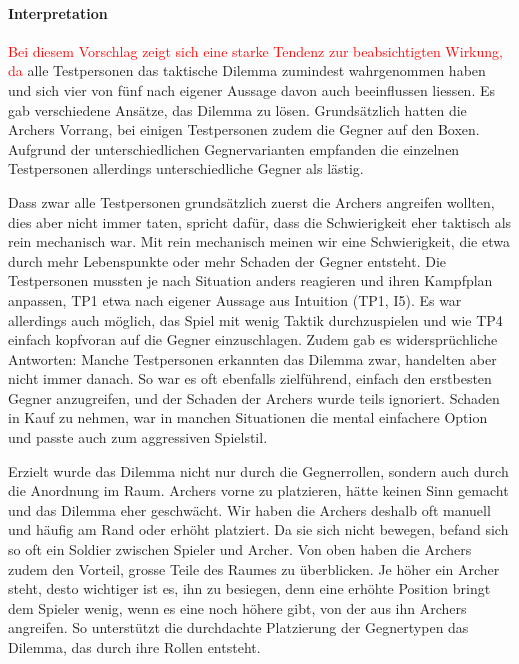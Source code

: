 \documentclass[../Main.tex]{subfiles}
\begin{document}
\paragraph{Interpretation}
\textcolor{red}{Bei diesem Vorschlag zeigt sich eine starke Tendenz zur beabsichtigten Wirkung, da} alle Testpersonen das taktische Dilemma zumindest wahrgenommen haben und sich vier von fünf nach eigener Aussage davon auch beeinflussen liessen. Es gab verschiedene Ansätze, das Dilemma zu lösen. Grundsätzlich hatten die Archers Vorrang, bei einigen Testpersonen zudem die Gegner auf den Boxen. Aufgrund der unterschiedlichen Gegnervarianten empfanden die einzelnen Testpersonen allerdings unterschiedliche Gegner als lästig.

Dass zwar alle Testpersonen grundsätzlich zuerst die Archers angreifen wollten, dies aber nicht immer taten, spricht dafür, dass die Schwierigkeit eher taktisch als rein mechanisch war. Mit rein mechanisch meinen wir eine Schwierigkeit, die etwa durch mehr Lebenspunkte oder mehr Schaden der Gegner entsteht. Die Testpersonen mussten je nach Situation anders reagieren und ihren Kampfplan anpassen, TP1 etwa nach eigener Aussage aus Intuition (TP1, I5). Es war allerdings auch möglich, das Spiel mit wenig Taktik durchzuspielen und wie TP4 einfach kopfvoran auf die Gegner einzuschlagen. Zudem gab es widersprüchliche Antworten: Manche Testpersonen erkannten das Dilemma zwar, handelten aber nicht immer danach. So war es oft ebenfalls zielführend, einfach den erstbesten Gegner anzugreifen, und der Schaden der Archers wurde teils ignoriert. Schaden in Kauf zu nehmen, war in manchen Situationen die mental einfachere Option und passte auch zum aggressiven Spielstil.

Erzielt wurde das Dilemma nicht nur durch die Gegnerrollen, sondern auch durch die Anordnung im Raum. Archers vorne zu platzieren, hätte keinen Sinn gemacht und das Dilemma eher geschwächt. Wir haben die Archers deshalb oft manuell und häufig am Rand oder erhöht platziert. Da sie sich nicht bewegen, befand sich so oft ein Soldier zwischen Spieler und Archer. Von oben haben die Archers zudem den Vorteil, grosse Teile des Raumes zu überblicken. Je höher ein Archer steht, desto wichtiger ist es, ihn zu besiegen, denn eine erhöhte Position bringt dem Spieler wenig, wenn es eine noch höhere gibt, von der aus ihn Archers angreifen. So unterstützt die durchdachte Platzierung der Gegnertypen das Dilemma, das durch ihre Rollen entsteht.
\end{document}
